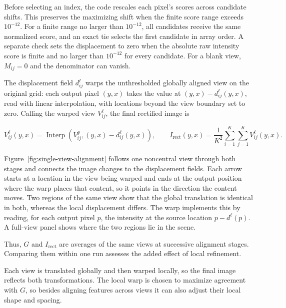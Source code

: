 Before selecting an index, the code rescales each pixel's scores across candidate shifts. This preserves the maximizing shift when the finite score range exceeds $10^{-12}$. For a finite range no larger than $10^{-12}$, all candidates receive the same normalized score, and an exact tie selects the first candidate in array order. A separate check sets the displacement to zero when the absolute raw intensity score is finite and no larger than $10^{-12}$ for every candidate. For a blank view, $M_{ij}=0$ and the denominator can vanish.

The displacement field $d^\ell_{ij}$ warps the unthresholded globally aligned view on the original grid: each output pixel $(y,x)$ takes the value at $(y,x)-d^\ell_{ij}(y,x)$, read with linear interpolation, with locations beyond the view boundary set to zero. Calling the warped view $V^\ell_{ij}$, the final rectified image is

\begin{equation}
    V^\ell_{ij}(y,x)=\operatorname{Interp}\!\left(V^g_{ij},(y,x)-d^\ell_{ij}(y,x)\right),
    \qquad I_{\mathrm{rect}}(y,x)=\frac{1}{K^2}\sum_{i=1}^{K}\sum_{j=1}^{K}V^\ell_{ij}(y,x).
\end{equation}

Figure~\ref{fig:single-view-alignment} follows one noncentral view through both stages and connects the image changes to the displacement fields. Each arrow starts at a location in the view being warped and ends at the output position where the warp places that content, so it points in the direction the content moves. Two regions of the same view show that the global translation is identical in both, whereas the local displacement differs. The warp implements this by reading, for each output pixel $p$, the intensity at the source location $p-d^\ell(p)$. A full-view panel shows where the two regions lie in the scene.


Thus, $G$ and $I_{\mathrm{rect}}$ are averages of the same views at successive alignment stages. Comparing them within one run assesses the added effect of local refinement.

Each view is translated globally and then warped locally, so the final image reflects both transformations. The local warp is chosen to maximize agreement with $G$, so besides aligning features across views it can also adjust their local shape and spacing.

\clearpage
\endgroup
